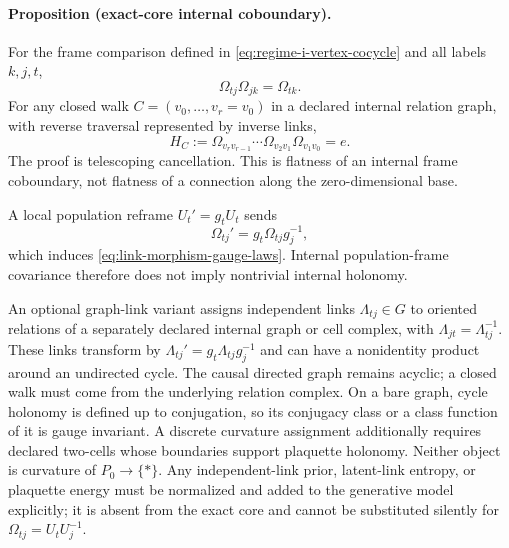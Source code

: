 \paragraph{Proposition (exact-core internal coboundary).}
For the frame comparison defined in \cref{eq:regime-i-vertex-cocycle} and all labels \(k,j,t\),
\begin{equation}
\Omega_{tj}\Omega_{jk}=\Omega_{tk}.
\label{eq:regime-i-cocycle-identity}
\end{equation}
For any closed walk \(C=(v_0,\ldots,v_r=v_0)\) in a declared internal relation graph, with reverse traversal represented by inverse links,
\begin{equation}
H_C
:=\Omega_{v_rv_{r-1}}\cdots\Omega_{v_2v_1}\Omega_{v_1v_0}
=e.
\label{eq:regime-i-loop-holonomy}
\end{equation}
The proof is telescoping cancellation. This is flatness of an internal frame coboundary, not flatness of a connection along the zero-dimensional base.

A local population reframe \(U_t'=g_tU_t\) sends
\begin{equation}
\Omega_{tj}'=g_t\Omega_{tj}g_j^{-1},
\label{eq:group-link-gauge-law}
\end{equation}
which induces \cref{eq:link-morphism-gauge-laws}. Internal population-frame covariance therefore does not imply nontrivial internal holonomy.

An optional graph-link variant assigns independent links \(\Lambda_{tj}\in G\) to oriented relations of a separately declared internal graph or cell complex, with \(\Lambda_{jt}=\Lambda_{tj}^{-1}\). These links transform by \(\Lambda_{tj}'=g_t\Lambda_{tj}g_j^{-1}\) and can have a nonidentity product around an undirected cycle. The causal directed graph remains acyclic; a closed walk must come from the underlying relation complex. On a bare graph, cycle holonomy is defined up to conjugation, so its conjugacy class or a class function of it is gauge invariant. A discrete curvature assignment additionally requires declared two-cells whose boundaries support plaquette holonomy. Neither object is curvature of \(P_0\to\{\ast\}\). Any independent-link prior, latent-link entropy, or plaquette energy must be normalized and added to the generative model explicitly; it is absent from the exact core and cannot be substituted silently for \(\Omega_{tj}=U_tU_j^{-1}\).
